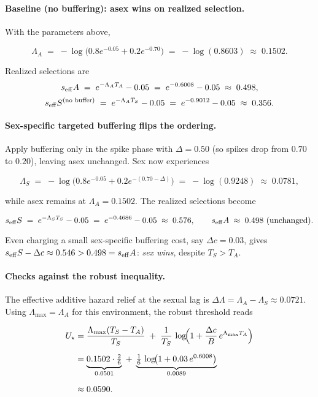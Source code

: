 \documentclass[11pt]{article}
\theoremstyle{upright}
\newcommand{\horizon}{\Lambda}
\newcommand{\seff}[1][]{s_{\mathrm{eff}\if\relax\detokenize{#1}\relax\else,#1\fi}}
\newcommand{\Lmax}{\horizon^{(T)}_{\max}}
\renewcommand{\Lmax}{\Lambda_{\max}}
\begin{document}
\paragraph{Baseline (no buffering): asex wins on realized selection.}
With the parameters above,

$$
\Lambda_A \;=\; -\log\!\big(0.8e^{-0.05}+0.2e^{-0.70}\big)
\;=\; -\log(0.8603)\;\approx\;0.1502.
$$

Realized selections are
\[
\seff{A} \;=\; e^{-\Lambda_A T_A} - 0.05
          \;=\; e^{-0.6008} - 0.05
          \;\approx\; 0.498,
\]
\[
\seff{S}^{\text{(no buffer)}} \;=\; e^{-\Lambda_A T_S} - 0.05
          \;=\; e^{-0.9012} - 0.05
          \;\approx\; 0.356.
\]

\paragraph{Sex-specific targeted buffering flips the ordering.}
Apply buffering only in the spike phase with $\Delta=0.50$ (so spikes drop from $0.70$ to $0.20$), leaving asex unchanged. Sex now experiences

$$
\Lambda_S \;=\; -\log\!\big(0.8e^{-0.05}+0.2e^{-(0.70-\Delta)}\big)
\;=\; -\log(0.9248)\;\approx\;0.0781,
$$

while asex remains at $\Lambda_A=0.1502$. The realized selections become

$$
\seff{S} \;=\; e^{-\Lambda_S T_S}-0.05 \;=\; e^{-0.4686}-0.05 \;\approx\;0.576,\qquad
\seff{A} \;\approx\;0.498\ \text{(unchanged)}.
$$

Even charging a small sex-specific buffering cost, say $\Delta c=0.03$, gives $\seff{S}-\Delta c\approx 0.546 > 0.498=\seff{A}$: \emph{sex wins}, despite $T_S>T_A$.

\paragraph{Checks against the robust inequality.}
The effective additive hazard relief at the sexual lag is $\Delta\Lambda=\Lambda_A-\Lambda_S\approx 0.0721$. Using $\Lmax=\Lambda_A$ for this environment, the robust threshold reads

\[
\begin{aligned}
U_\star
  &= \frac{\Lmax (T_S - T_A)}{T_S}
     \;+\; \frac{1}{T_S}\,\log\!\Bigl(1+\frac{\Delta c}{B}\,e^{\Lmax T_A}\Bigr) \\[6pt]
  &= \underbrace{0.1502 \cdot \tfrac{2}{6}}_{0.0501}
     \;+\; \underbrace{\tfrac{1}{6}\,\log\!\bigl(1+0.03\,e^{0.6008}\bigr)}_{0.0089} \\[6pt]
  &\approx 0.0590.
\end{aligned}
\]
\end{document}
